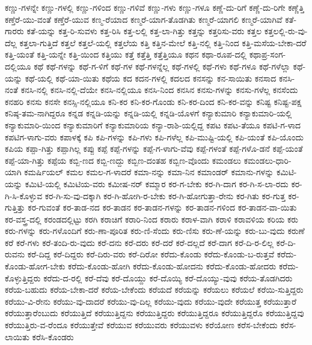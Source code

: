 {ಕಣ್ಣು-ಗಳನ್ನೇ
ಕಣ್ಣು-ಗಳಲ್ಲಿ
ಕಣ್ಣು-ಗಳಿಂದ
ಕಣ್ಣು-ಗಳಿವೆ
ಕಣ್ಣು-ಗಳು
ಕಣ್ಣು-ಗಳೂ
ಕಣ್ಣೆ-ದು-ರಿಗೆ
ಕಣ್ಣೆ-ದು-ರಿಗೇ
ಕಣ್ಣೆತ್ತಿ
ಕಣ್ತೆರೆ-ಯು-ವಂತೆ
ಕಣ್ತೆರೆ-ಯುವ
ಕಣ್ಮ-ರೆಯಾದ
ಕಣ್ಮರೆ-ಯಾಗ-ತೊಡಗಿತು
ಕಣ್ಮರೆ-ಯಾಗಲಿ
ಕಣ್ಮರೆ-ಯಾಗಿವೆ
ಕತೆ-ಗಾರರು
ಕತೆ-ಯನ್ನು
ಕತ್ತ-ರಿ-ಸುವಳು
ಕತ್ತ-ರಿಸಿ
ಕತ್ತ-ಲಲ್ಲಿ
ಕತ್ತ-ಲಾ-ಗಿತ್ತು
ಕತ್ತನ್ನು
ಕತ್ತರಿಸು-ವರು
ಕತ್ತಲ
ಕತ್ತಲಲ್ಲಿ-ರು-ವು-ದೆಲ್ಲ
ಕತ್ತಲಾ-ಗುತ್ತಿದೆ
ಕತ್ತಲೆ
ಕತ್ತಲೆ-ಯಲ್ಲಿ
ಕತ್ತಲೆಯ
ಕತ್ತಿ
ಕತ್ತಿನ-ಮೇಲೆ
ಕತ್ತಿ-ನಲ್ಲಿ
ಕತ್ತಿ-ನಿಂದ
ಕತ್ತಿ-ಮಸೆಯ-ಬೇಕಾ-ದರೆ
ಕತ್ತಿ-ಯಂತೆ
ಕತ್ತಿ-ಯನ್ನೇ
ಕತ್ತಿ-ಯಿಂದ
ಕತ್ತಿಯು
ಕತ್ತೆ
ಕತ್ತೆತ್ತಿ
ಕತ್ತೆತ್ತಿಯೂ
ಕಥನ
ಕಥಾ-ರೂಪ-ದಲ್ಲಿ
ಕಥಾಪ್ರ-ಸಂಗ-ದಲ್ಲಿಯೂ
ಕಥೆ
ಕಥೆ-ಗಳನ್ನು
ಕಥೆ-ಗ-ಳಿಗೆ
ಕಥೆ-ಗಳ
ಕಥೆ-ಗಳನ್ನೆಲ್ಲ
ಕಥೆ-ಗಳಲ್ಲಿ
ಕಥೆ-ಗಳು
ಕಥೆ-ಗಳೂ
ಕಥೆ-ಗಳೆಲ್ಲಾ
ಕಥೆ-ಯನ್ನು
ಕಥೆ-ಯಲ್ಲಿ
ಕಥೆ-ಯಾ-ಯಿತು
ಕಥೆಯ
ಕದ
ಕದನ-ಗಳಲ್ಲಿ
ಕದಲದ
ಕನಸನ್ನು
ಕನ-ಸಾಯಿತು
ಕನಸಾದ
ಕನಸಿ-ನಂತೆ
ಕನಸಿ-ನಲ್ಲಿ
ಕನಸಿ-ನಲ್ಲಿ-ದೆಯೇ
ಕನಸಿ-ನಲ್ಲಿಯೂ
ಕನಸಿ-ನಿಂದ
ಕನಸಿನ
ಕನಸು-ಗಳನ್ನು
ಕನಸು-ಗಳೆಲ್ಲ
ಕನಸೆಂದು
ಕನಹರಿ
ಕನಸು
ಕನಸೇ
ಕನಸ್ಸಿ-ನಲ್ಲಿಯೂ
ಕನಿ-ಕರ
ಕನಿ-ಕರ-ಗೊಂಡು
ಕನಿ-ಕರ-ದಿಂದ
ಕನಿ-ಕರ-ವನ್ನು
ಕನಿಷ್ಟ
ಕನಿಷ್ಟ-ಪಕ್ಷ
ಕನಿಷ್ಠ-ತಮ-ನಾಗಿದ್ದರೂ
ಕನ್ನಡ
ಕನ್ನಡಿ-ಯನ್ನು
ಕನ್ನಡಿ-ಯಲ್ಲಿ
ಕನ್ನಡಿ-ಯೊಳಗೆ
ಕನ್ಯಾಕುಮಾರಿ
ಕನ್ಯಾಕುಮಾರಿ-ಯಲ್ಲಿ
ಕನ್ಯಾಕುಮಾರಿ-ಯಿಂದ
ಕನ್ಯಾಕುಮಾರಿಗೆ
ಕನ್ಯಾಕುಮಾರಿಯ
ಕನ್ಯಾ-ರಾಶಿ-ಯಲ್ಲಿದ್ದ
ಕಪಟ
ಕಪಟ-ತೆಯೂ
ಕಪಟಿ-ಗ-ಳಾದ
ಕಪಟಿಗ-ಳಾಗು-ವರು
ಕಪಾಳಕ್ಕೆ
ಕಪಿ
ಕಪಿ-ಗಳನ್ನು
ಕಪಿ-ಗಳು
ಕಪಿ-ಗಳೆಲ್ಲ
ಕಪಿ-ಮುಷ್ಟಿ-ಯಲ್ಲಿ
ಕಪಿ-ಯಂತೆ
ಕಪಿ-ಯೊಂದು
ಕಪಿಯ
ಕಪ್ಪಾ-ಗಿತ್ತು
ಕಪ್ಪಾಗಿಲ್ಲ
ಕಪ್ಪು
ಕಪ್ಪೆ
ಕಪ್ಪೆ-ಗಳನ್ನು
ಕಪ್ಪೆ-ಗ-ಳಾಗು-ವೆವು
ಕಪ್ಪೆ-ಗಳಂತೆ
ಕಪ್ಪೆ-ಗಳೊ-ಡನೆ
ಕಪ್ಪೆ-ಯಂತೆ
ಕಪ್ಪೆ-ಯಾ-ಗಿತ್ತು
ಕಪ್ಪೆಯ
ಕಬ್ಬಿ-ಣದ
ಕಬ್ಬಿ-ಣದ್ದು
ಕಬ್ಬಿಣ-ದಂತಹ
ಕಬ್ಬಿಣ-ವೊಂದು
ಕಮಂಡಲು
ಕಮಂಡಲು-ಧಾರಿ-ಯಾಗಿ
ಕಮರ್ಷಿಯಲ್
ಕಮಲ
ಕಮಲ-ಗ-ಳಾದರೆ
ಕಮಾ-ನನ್ನು
ಕಮಾ-ನಿನ
ಕಮಾಂಡರ್
ಕಮಾನು-ಗಳನ್ನು
ಕಮಿಟಿ-ಯನ್ನು
ಕಮಿಟಿ-ಯಲ್ಲಿ
ಕಮಿಟಿಯ-ವರು
ಕಮೀಷ-ನರ್
ಕಮ್ಮಾರ
ಕರ-ಗ-ಬೇಕು
ಕರ-ಗಿ-ದಾಗ
ಕರ-ಗಿ-ಸ-ಲಾ-ರದು
ಕರ-ಗಿ-ಸಿ-ಕೊಳ್ಳುವ
ಕರ-ಗಿ-ಸು-ವು-ದಕ್ಕಾಗಿ
ಕರ-ಗಿ-ಹೋಗಿ-ರ-ಬೇಕು
ಕರ-ಗಿ-ಹೋಗುತ್ತಾ-ರೇನು
ಕರ-ಗಿತು
ಕರ-ಗುತ್ತ
ಕರ-ಗುತ್ತಿತ್ತು
ಕರ-ಗುವಂತೆ
ಕರ-ತಾಡ-ನದ
ಕರ-ತಾಡನ
ಕರ-ತಾಡನ-ಗಳನ್ನು
ಕರ-ತಾಡನ-ಗಳಿಂದ
ಕರ-ತಾಡನ-ವಾ-ಯಿತು
ಕರ-ವಸ್ತ್ರ-ದಲ್ಲಿ
ಕರಂಡದಲ್ಲಿಟ್ಟು
ಕರಗಿ
ಕರಾಚಿಗೆ
ಕರಾರಿ-ನಿಂದ
ಕರಾರು
ಕರಾಳ-ವಾಗಿ
ಕರಾಳಿ
ಕರಾವಳಿಯ
ಕರಿಯ
ಕರು
ಕರು-ಗಳನ್ನು
ಕರು-ಗಳೊಂದಿಗೆ
ಕರು-ಣಾ-ಪೂರಿತ
ಕರು-ಣಿ-ಸೆಂದು
ಕರು-ಣಿಸು
ಕರು-ಣೆ-ಯನ್ನು
ಕರು-ಬು-ವುದು
ಕರುಣೆ
ಕರೆ
ಕರೆ-ಗಳು
ಕರೆ-ತಂದಿ-ರು-ವುದು
ಕರೆ-ದನು
ಕರೆ-ದರು
ಕರೆ-ದರೆ
ಕರೆ-ದಲ್ಲದೆ
ಕರೆ-ದಾಗ
ಕರೆ-ದಿ-ರ-ಲಿಲ್ಲ
ಕರೆ-ದಿ-ರುವನು
ಕರೆ-ದಿದ್ದ
ಕರೆ-ದಿದ್ದರು
ಕರೆ-ದಿರು-ವರು
ಕರೆ-ದಿರೋ
ಕರೆದು-ಕೊಂಡು
ಕರೆದು-ಕೊಂಡು-ಬ-ರುತ್ತವೆ
ಕರೆದು-ಕೊಂಡು-ಹೋಗ-ಬೇಕು
ಕರೆದು-ಕೊಂಡು-ಹೋಗಿ
ಕರೆದು-ಕೊಂಡು-ಹೋದನು
ಕರೆದು-ಕೊಂಡು-ಹೋದರು
ಕರೆದು-ಕೊಳ್ಳುತ್ತಿದ್ದರು
ಕರೆದು-ದ-ರಲ್ಲಿ
ಕರೆ-ದೆವು
ಕರೆ-ದೊಯ್ದು
ಕರೆ-ದೊಯ್ಯಿ
ಕರೆ-ದೊಯ್ಯು-ವುವು
ಕರೆಯ-ತೊಡಗಿದರು
ಕರೆಯ-ಬಹುದು
ಕರೆಯ-ಬೇಕಾ-ದರೆ
ಕರೆಯ-ಬೇಕೆಂದು
ಕರೆಯದೆ
ಕರೆಯನ್ನು
ಕರೆಯಲು
ಕರೆಯಲೆ
ಕರೆಯಿ-ಸುತ್ತಿದ್ದರು
ಕರೆಯು-ವಿ-ರೇನು
ಕರೆಯು-ವು-ದಾದರೆ
ಕರೆಯು-ವು-ದಿಲ್ಲ
ಕರೆಯು-ವುದು
ಕರೆಯು-ವುದೇ
ಕರೆಯುತ್ತ
ಕರೆಯುತ್ತಾರೆ
ಕರೆಯುತ್ತಾರೆಂಬುದು
ಕರೆಯುತ್ತಿದೆ
ಕರೆಯುತ್ತಿದ್ದನು
ಕರೆಯುತ್ತಿದ್ದರು
ಕರೆಯುತ್ತಿದ್ದರೂ
ಕರೆಯುತ್ತಿದ್ದರೊ
ಕರೆಯುತ್ತಿದ್ದವು
ಕರೆಯುತ್ತಿರು-ವ-ರೆಂದೂ
ಕರೆಯುತ್ತೇವೆ
ಕರೆಯುವ
ಕರೆಯುವರು
ಕರೆಯುವಳು
ಕರೆಯೋಣ
ಕರೆಸ-ಬೇಕೆಂದು
ಕರೆಸ-ಲಾಯಿತು
ಕರೆಸಿ-ಕೊಂಡರು
}
